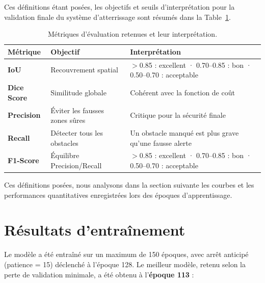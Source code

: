 Ces définitions étant posées, les objectifs et seuils d'interprétation pour la validation finale du système d'atterrissage sont résumés dans la Table~\ref{tab:metriques}.

\begin{table}[!ht]
  \centering
  \caption{Métriques d'évaluation retenues et leur interprétation.}
  \label{tab:metriques}
  \renewcommand{\arraystretch}{1.4}
  \begin{tabularx}{0.95\textwidth}{
    >{\bfseries\color{ENIADBlue}}l
    >{\centering\arraybackslash}X
    >{\arraybackslash}X
  }
    \toprule
    \rowcolor{ENIADBlue!12}
    \textbf{Métrique} & \textbf{Objectif} & \textbf{Interprétation} \\
    \midrule
    IoU & Recouvrement spatial & $>$0.85 : excellent · 0.70--0.85 : bon · 0.50--0.70 : acceptable \\
    \rowcolor{ENIADLightBlue!20}
    Dice Score & Similitude globale & Cohérent avec la fonction de coût \\
    Precision & Éviter les fausses zones sûres & Critique pour la sécurité finale \\
    \rowcolor{ENIADLightBlue!20}
    Recall & Détecter tous les obstacles & Un obstacle manqué est plus grave qu'une fausse alerte \\
    F1-Score & Équilibre Precision/Recall & $>$0.85 : excellent · 0.70--0.85 : bon · 0.50--0.70 : acceptable \\
    \bottomrule
  \end{tabularx}
\end{table}

Ces définitions posées, nous analysons dans la section suivante les courbes et les performances quantitatives enregistrées lors des époques d'apprentissage.

\section{Résultats d'entraînement}
\label{sec:resultats-entrainement}

Le modèle a été entraîné sur un maximum de 150 époques, avec arrêt anticipé (patience = 15) déclenché à l'époque 128. Le meilleur modèle, retenu selon la perte de validation minimale, a été obtenu à l'\textbf{époque 113} :

